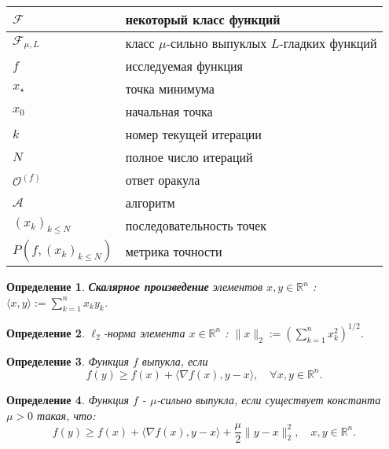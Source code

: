 \documentclass{article}
\newcommand{\R}{\mathbb{R}}
\newtheorem{Def}{Определение}[section]
\begin{document}
\begin{table}[h!]
\centering
 \begin{tabular}{||p{2 cm} | p{8cm}||} 
 \hline

 $\mathcal{F}$ & некоторый класс функций  \\ 
 \hline
 $\mathcal{F}_{\mu, L}$ & класс $\mu$-сильно выпуклых $L$-гладких функций  \\ 
 \hline
 $f$ & исследуемая функция  \\
 \hline
 $x_{\star}$ & точка минимума  \\
 \hline
 $x_0$ & начальная точка  \\
 \hline
 $k$ & номер текущей итерации  \\
 \hline
 $N$ & полное число итераций  \\
 \hline
 $\mathcal{O}^{(f)}$ & ответ оракула  \\ 
 \hline
 $\mathcal{A}$ & алгоритм  \\
 \hline
 $(x_k)_{k \le N}$ & последовательность точек  \\
 \hline
 $P(f, (x_k)_{k \le N})$ & метрика точности  \\[1ex] 
 \hline
 \end{tabular}
\end{table}


\begin{Def}
\textbf{Скалярное произведение} элементов $x,y \in \R^n$ : $\langle x,y \rangle := \sum\limits_{k=1}^n x_ky_k$.
\end{Def}

\begin{Def}
$\ell_2$-норма элемента $x \in \R^n$ : $\|x\|_2 := \left(\sum\limits_{k=1}^n x_k^2\right)^{1/2}$.
\end{Def}

\begin{Def}
Функция $f$ выпукла, если 
\begin{equation}
    f(y) \geq f(x)+\langle\nabla f(x), y-x\rangle, \quad \forall x, y \in \mathbb{R}^n.
\end{equation}
\end{Def}

\begin{Def}
Функция $f$ - $\mu$-сильно выпукла, если существует константа $\mu > 0$ такая, что:
    \begin{equation}\label{eq:str_cvx}
        f(y) \geq f(x) + \langle \nabla f(x), y - x \rangle + \frac{\mu}{2}\|y - x\|_2^2, \quad x, y \in \R^n. 
    \end{equation}
\end{Def}
\end{document}
